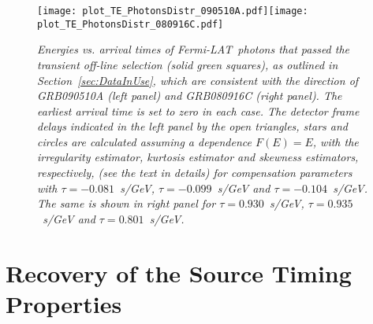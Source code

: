\documentclass[12pt]{article}
\newcommand{\lat}{{\it Fermi}-LAT}
\begin{document}
\begin{figure}
\centering
\texttt{[image: plot\_TE\_PhotonsDistr\_090510A.pdf]}\hspace{0cm}\texttt{[image: plot\_TE\_PhotonsDistr\_080916C.pdf]}
\vspace{-0.4cm}
\caption{\it Energies vs. arrival times of \lat~photons that passed the transient off-line selection (solid green squares),
as outlined in Section~\ref{sec:DataInUse}, which are consistent with the direction of GRB090510A (left panel) and GRB080916C (right panel).
The earliest arrival time is set to zero in each case.
The detector frame delays indicated in the left panel by the open triangles, stars and circles  are calculated assuming a dependence $F(E)=E$,
with the irregularity estimator, kurtosis estimator and skewness estimators, respectively, (see the text in details) for compensation parameters
with $\tau  = -0.081$~s/GeV, $\tau  = -0.099$~s/GeV
and $\tau  = -0.104$~s/GeV. The same is shown in right panel
for $\tau  = 0.930$~s/GeV, $\tau  = 0.935$~s/GeV
and $\tau  = 0.801$~s/GeV.}
\label{fig:DATA_090510}
\end{figure}

\section{Recovery of the Source Timing Properties}
\label{sec:recov}
\end{document}
